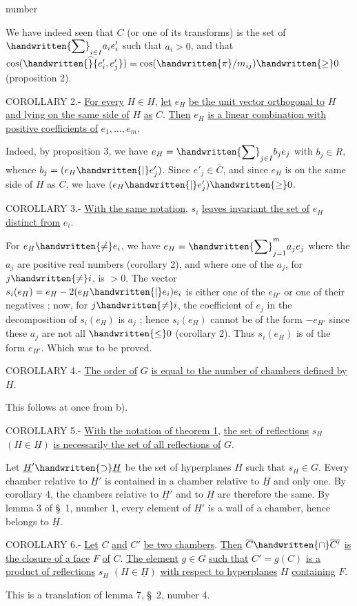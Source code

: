 \begin{flushright}number \end{flushright}
We have indeed seen that $C$ (or one of its transforms) is the set of $\displaystyle\handwritten{\sum}_{i\in I}a_i e'_i$ such that $a_i>0$, and that $\cos(\handwritten{\widehat}{e'_i,e'_j})=\cos(\handwritten{\pi}/m_{ij})\handwritten{\geq}0$ (proposition 2).

COROLLARY 2.- \uline{For every} $H\in\underline{H}$, \uline{let} $e_H$ \uline{be the unit vector orthogonal to} $H$ \uline{and lying on the same side of} $H$ \uline{as} $C$. \uline{Then} $e_H$ \uline{is a linear combination with positive coefficients of} $e_1,\ldots,e_m$.

Indeed, by proposition 3, we have $\displaystyle e_H=\handwritten{\sum}_{j\in I}b_j e_j$ with $b_j\in R$, whence $b_j=(e_H\handwritten{|}e'_j)$. Since $e'_j\in\overline{C}$, and since $e_H$ is on the same side of $H$ as $C$, we have $(e_H\handwritten{|}e'_j)\handwritten{\geq}0$.

COROLLARY 3.- \uline{With the same notation}, $s_i$ \uline{leaves invariant the set of} $e_H$ \uline{distinct from} $e_i$.

For $e_H\handwritten{\ne}e_i$, we have $\displaystyle e_H=\handwritten{\sum}_{j=1}^m a_j e_j$ where the $a_j$ are positive real numbers (corollary 2), and where one of the $a_j$, for $j\handwritten{\ne}i$, is $>0$. The vector $s_i(e_H)=e_H-2(e_H\handwritten{|}e_i)e_i$ is either one of the $e_{H'}$ or one of their negatives ; now, for $j\handwritten{\ne}i$, the coefficient of $e_j$ in the decomposition of $s_i(e_H)$ is $a_j$ ; hence $s_i(e_H)$ cannot be of the form $-e_{H'}$ since these $a_j$ are not all $\handwritten{\leq}0$ (corollary 2). Thus $s_i(e_H)$ is of the form $e_{H'}$. Which was to be proved.

COROLLARY 4.- \uline{The order of} $G$ \uline{is equal to the number of chambers defined by} $\underline{H}$.

This follows at once from b).

COROLLARY 5.- \uline{With the notation of theorem 1}, \uline{the set of reflections} $s_H$ $(H\in\underline{H})$ \uline{is necessarily the set of all reflections of} $G$.

Let $\underline{H}'\handwritten{\supset}\underline{H}$ be the set of hyperplanes $H$ such that $s_H\in G$. Every chamber relative to $\underline{H}'$ is contained in a chamber relative to $\underline{H}$ and only one. By corollary 4, the chambers relative to $\underline{H}'$ and to $\underline{H}$ are therefore the same. By lemma 3 of \S\ 1, number 1, every element of $\underline{H}'$ is a wall of a chamber, hence belongs to $\underline{H}$.

COROLLARY 6.- \uline{Let} $C$ \uline{and} $C'$ \uline{be two chambers}. \uline{Then} $\overline{C}\handwritten{\cap}\overline{C'}$ \uline{is the closure of a face} $F$ \uline{of} $C$. \uline{The element} $g\in G$ \uline{such that} $C'=g(C)$ \uline{is a product of reflections} $s_H$ $(H\in\underline{H})$ \uline{with respect to hyperplanes} $H$ \uline{containing} $F$.

This is a translation of lemma 7, \S\ 2, number 4.
